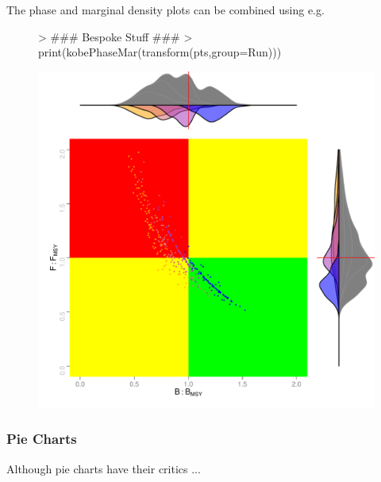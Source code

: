 \documentclass[shortnames,nojss,article]{jss}
\begin{document}
The phase and marginal density plots can be combined using  e.g.

\begin{figure}\begin{center}
\begin{Schunk}
\begin{Sinput}
> ### Bespoke Stuff ###
> print(kobePhaseMar(transform(pts,group=Run)))          
\end{Sinput}
\end{Schunk}
\includegraphics{kobe-023}
\end{center}\end{figure}

\clearpage

\subsubsection{Pie Charts}

Although pie charts have their critics ...
\end{document}
